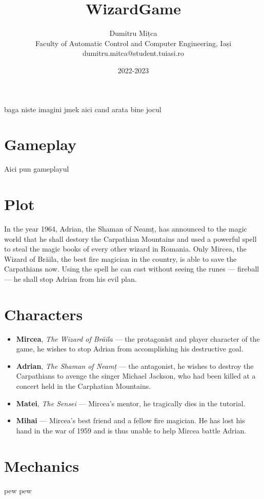\documentclass{article}
\title{\textbf{WizardGame}}
\author{
    Dumitru Mițca\\
    Faculty of Automatic Control and Computer Engineering, Iași\\
    dumitru.mitca@student.tuiasi.ro}
\date{2022-2023}
\begin{document}
    \maketitle

    baga niste imagini jmek aici cand arata bine jocul

    \section{Gameplay}
    Aici pun gameplayul

    \section{Plot}

    In the year 1964, Adrian, the Shaman of Neamț, has announced to the magic world that he
    shall destory the Carpathian Mountains and used a powerful spell to steal the magic books of
    every other wizard in Romania. Only Mircea, the Wizard of Brăila, the best fire magician in the
    country, is able to save the Carpathians now. Using the spell he can cast without seeing the
    runes --- fireball --- he shall stop Adrian from his evil plan.

    \section{Characters}
    \begin{itemize}
        \item \textbf{Mircea}, \emph{The Wizard of Brăila} --- the protagonist and player character
        of the game, he wishes to stop Adrian from accomplishing his destructive goal.
        \item \textbf{Adrian}, \emph{The Shaman of Neamț} --- the antagonist, he wishes to
        destroy the Carpathians to avenge the singer Michael Jackson, who had been killed at a concert
        held in the Carphatian Mountains.
        \item \textbf{Matei}, \emph{The Sensei} --- Mircea's mentor, he tragically dies in the tutorial.
        \item \textbf{Mihai} --- Mircea's best friend and a fellow fire magician. He has lost his hand
        in the war of 1959 and is thus unable to help Mircea battle Adrian.
    \end{itemize}

    \section{Mechanics}
    pew pew
\end{document}
